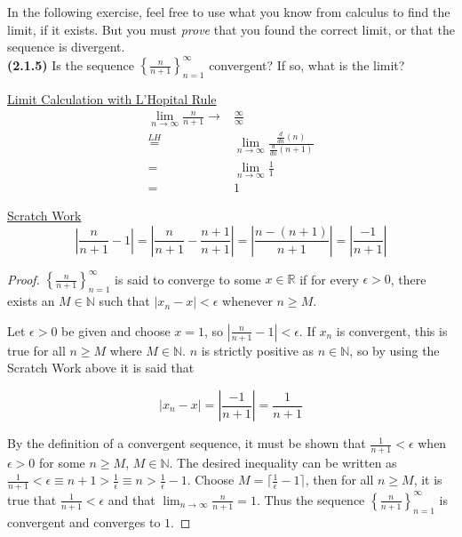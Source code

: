 \documentclass[12pt]{article}
\newcommand{\set}[1]{\left\{ {#1} \right\}}
\newcommand{\limtoinf}[1]{\lim_{ {#1} \to\infty}}
\newcommand{\abs}[1]{\left| {#1} \right|}
\newcommand{\ceil}[1]{\lceil {#1} \rceil}
\newcommand{\bR}{\mathbb{R}}
\newcommand{\bN}{\mathbb{N}}
\begin{document}
\pagestyle{fancy}
\setlength{\headheight}{14.49998pt}
\fancyfoot[C]{\thepage}

\noindent In the following exercise, feel free to use what you know from calculus to find the limit, if it exists. But you must \textit{prove} that you found the correct limit, or that the sequence is divergent. \\

\noindent \textbf{(2.1.5)} Is the sequence $\set{\frac{n}{n+1}}_{n=1}^\infty$ convergent? If so, what is the limit?

\noindent \underline{Limit Calculation with L'Hopital Rule}
\begin{align*}
	\limtoinf{n} \frac{n}{n+1} \to & \frac{\infty}{\infty} \\
	\overset{LH}{=}& \limtoinf{n} \frac{\frac{d}{dn}(n)}{\frac{d}{dn}(n+1)} \\
	=& \limtoinf{n} \frac{1}{1} \\
	=& 1
\end{align*}

\noindent \underline{Scratch Work}
\begin{equation*}
	\abs{\frac{n}{n+1}-1}=\abs{\frac{n}{n+1}-\frac{n+1}{n+1}}=\abs{\frac{n-(n+1)}{n+1}}=\abs{\frac{-1}{n+1}}
\end{equation*}

\begin{proof}
	$\set{\frac{n}{n+1}}_{n=1}^\infty$ is said to converge to some $x\in\bR$ if for every $\epsilon>0$, there exists an $M\in\bN$ such that $\abs{x_n-x}<\epsilon$ whenever $n\ge M$.
	
\indent Let $\epsilon > 0$ be given and choose $x=1$, so $\abs{\frac{n}{n+1}-1}<\epsilon$. If $x_n$ is convergent, this is true for all $n\ge M$ where $M\in\bN$. $n$ is strictly positive as $n\in\bN$, so by using the Scratch Work above it is said that

\begin{equation*}
	\abs{x_n-x}=\abs{\frac{-1}{n+1}}=\frac{1}{n+1}
\end{equation*}

\noindent By the definition of a convergent sequence, it must be shown that $\frac{1}{n+1}<\epsilon$ when $\epsilon >0$ for some $n\ge M$, $M\in\bN$. The desired inequality can be written as $\frac{1}{n+1}<\epsilon\equiv n+1>\frac{1}{\epsilon}\equiv n>\frac{1}{\epsilon}-1$. Choose $M=\ceil{\frac{1}{\epsilon}-1}$, then for all $n\ge M$, it is true that $\frac{1}{n+1}<\epsilon$ and that $\limtoinf{n} \frac{n}{n+1}=1$. Thus the sequence $\set{\frac{n}{n+1}}_{n=1}^\infty$ is convergent and converges to $1$. 
\end{proof}
\end{document}
